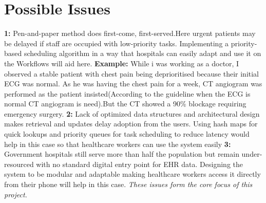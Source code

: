 \section{Possible Issues}
\textbf{1:} Pen-and-paper method does first-come, first-served.Here urgent patients may be delayed if staff are occupied with low-priority tasks. 
Implementing a priority-based scheduling algorithm in a way that hospitals can easily adapt and use it on the Workflows will aid here.
 \textbf{Example:} While i was working as a doctor, I observed a stable patient with chest pain being deprioritised because their initial ECG was normal. As he was having the chest pain for a week,  CT angiogram was performed as the patient insisted(According to the guideline when the ECG is normal CT angiogram is need).But the CT showed a 90\% blockage requiring emergency  surgery.
\textbf{2:} Lack of optimized data structures and architectural design makes  retrieval and updates delay adoption from the users.
Using  hash maps for quick lookups and priority queues for task scheduling to reduce  latency would help in this case so that  healthcare workers can use the system easily
\textbf{3:} Government hospitals still serve more than half the population but remain under-resourced with no standard digital entry point for EHR data. 
Designing the system to be modular and adaptable making healthcare workers access it directly from their phone will help in this case.
\noindent\textit{These issues form the core focus of this project.}
